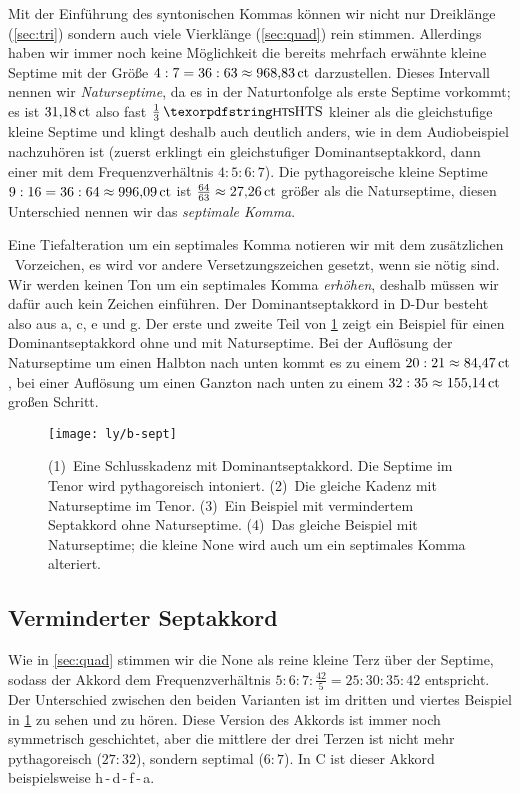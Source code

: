Mit der Einführung des syntonischen Kommas können wir nicht nur Dreiklänge
(\cref{sec:tri}) sondern auch viele Vierklänge (\cref{sec:quad}) rein stimmen.
Allerdings haben wir immer noch keine Möglichkeit die bereits mehrfach erwähnte
kleine Septime mit der Größe $4:7=36:63\approx 968{,}83\,\mathrm{ct}$ darzustellen.
Dieses Intervall nennen wir \emph{Naturseptime}, da es in der Naturtonfolge als
erste Septime vorkommt; es ist $31{,}18\,\mathrm{ct}$ also fast
$\frac13\,\text{\acr{HTS}}$ kleiner als die gleichstufige kleine Septime und
klingt deshalb auch deutlich anders, wie in dem Audiobeispiel nachzuhören
ist (zuerst erklingt ein gleichstufiger Dominantseptakkord, dann
einer mit dem Frequenzverhältnis $4:5:6:7$). Die pythagoreische kleine Septime
$9:16=36:64\approx 996{,}09\,\mathrm{ct}$ ist
$\frac{64}{63}\approx 27{,}26\,\mathrm{ct}$ größer als die Naturseptime, diesen
Unterschied nennen wir das \emph{septimale Komma}.

Eine Tiefalteration um ein septimales Komma notieren wir mit dem zusätzlichen
\septimal\ Vorzeichen, es wird vor andere Versetzungszeichen gesetzt, wenn sie
nötig sind. Wir werden keinen Ton um ein septimales Komma \emph{erhöhen},
deshalb müssen wir dafür auch kein Zeichen einführen. Der Dominantseptakkord in
D-Dur besteht also aus a, \sharpm c, e und \septimal g. Der erste und zweite
Teil von \cref{fig:sept} zeigt ein Beispiel für einen Dominantseptakkord ohne
und mit Naturseptime. Bei der Auflösung der Naturseptime um einen Halbton nach
unten kommt es zu einem $20:21\approx 84{,}47\,\mathrm{ct}$, bei einer Auflösung um
einen Ganzton nach unten zu einem $32:35\approx 155{,}14\,\mathrm{ct}$ großen
Schritt.

\begin{figure}
	\centering
	\texttt{[image: ly/b-sept]}
	\caption{(1)~Eine Schlusskadenz mit Dominantseptakkord. Die Septime im
		Tenor wird pythagoreisch intoniert.
		\quad(2)~Die gleiche Kadenz mit Naturseptime im Tenor.
		\quad(3)~Ein Beispiel mit vermindertem Septakkord ohne Naturseptime.
		\quad(4)~Das gleiche Beispiel mit Naturseptime; die kleine None wird
		auch um ein septimales Komma alteriert.}\label{fig:sept}
\end{figure}

\subsection{Verminderter Septakkord}

Wie in \cref{sec:quad} stimmen wir die None als reine kleine Terz über der
Septime, sodass der Akkord dem Frequenzverhältnis $5:6:7:\frac{42}5 = 25:30:35:42$
entspricht. Der Unterschied zwischen den beiden Varianten ist im dritten und
viertes Beispiel in \cref{fig:sept} zu sehen und zu hören. Diese Version des
Akkords ist immer noch symmetrisch geschichtet, aber die mittlere der drei
Terzen ist nicht mehr pythagoreisch ($27:32$), sondern septimal ($6:7$). In C ist dieser Akkord beispielsweise \naturalm h\,-\,d\,-\,\septimal f\,-\,\septimal \flatp a.

